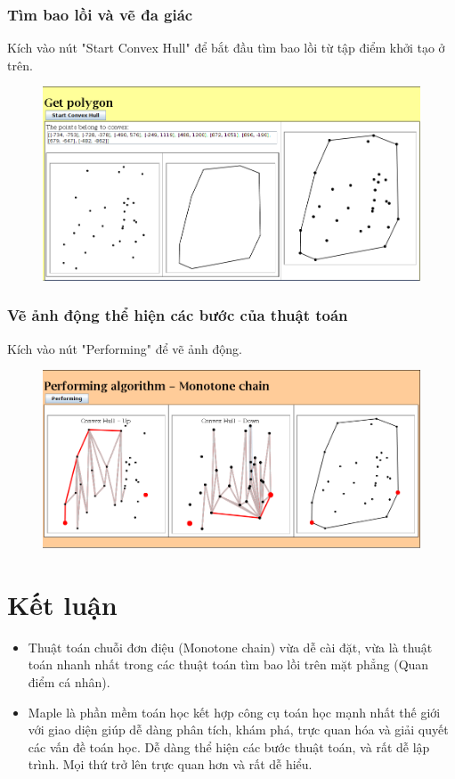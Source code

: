 \documentclass[12pt]{article}
\begin{document}
        \subsubsection{Tìm bao lồi và vẽ đa giác}
          Kích vào nút "Start Convex Hull" để bắt đầu tìm bao lồi từ tập điểm khởi tạo ở trên.
          \begin{figure}[h]
            \includegraphics[scale=0.4]{Image/poly}
          \end{figure}
        \subsubsection{Vẽ ảnh động thể hiện các bước của thuật toán}
          Kích vào nút "Performing" để vẽ ảnh động.
          \begin{figure}[h]
            \includegraphics[scale=0.4]{Image/ani}
          \end{figure}
    \section{Kết luận}
    \begin{itemize}
      \item Thuật toán chuỗi đơn điệu (Monotone chain) vừa dễ cài đặt, vừa là thuật toán nhanh nhất trong các thuật toán tìm bao lồi trên mặt phẳng (Quan điểm cá nhân). 
      \item Maple là phần mềm toán học kết hợp công cụ toán học mạnh nhất thế giới với giao diện giúp dễ dàng phân tích, khám phá, trực quan hóa và giải quyết các vấn đề toán học.
      Dễ dàng thể hiện các bước thuật toán, và rất dễ lập trình.
      Mọi thứ trở lên trực quan hơn và rất dễ hiểu.
    \end{itemize}
    
\end{document}
